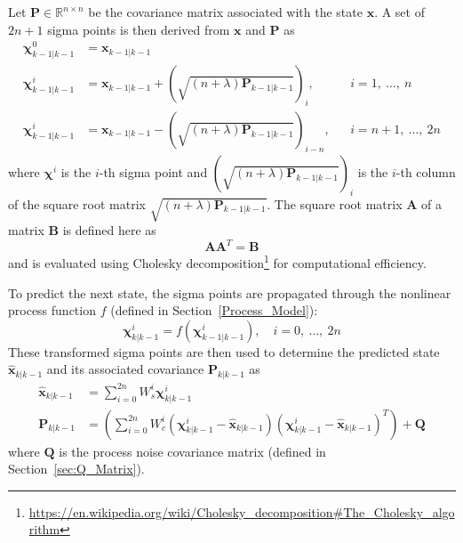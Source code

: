Let $\mathbf{P} \in \mathbb{R}^{n \times n}$ be the covariance matrix associated with the state $\mathbf{x}$. A set of $2n + 1$ sigma points is then derived from $\mathbf{x}$ and $\mathbf{P}$ as
%
\begin{align}
\bm{\chi}^{0}_{k-1 | k-1} &= \mathbf{x}_{k-1 | k-1} \nonumber\\
\bm{\chi}^{i}_{k-1 | k-1} &= \mathbf{x}_{k-1 | k-1} + \left( \sqrt{\left( n + \lambda \right) \mathbf{P}_{k-1 | k-1}} \right)_{i}, &&i = 1,\ \dots,\ n \\
\bm{\chi}^{i}_{k-1 | k-1} &= \mathbf{x}_{k-1 | k-1} - \left( \sqrt{\left( n + \lambda \right) \mathbf{P}_{k-1 | k-1}} \right)_{i-n}, &&i = n+1,\ \dots,\ 2n \nonumber
\end{align}
%
where $\bm{\chi}^{i}$ is the $i$-th sigma point and $\left( \sqrt{\left( n + \lambda \right) \mathbf{P}_{k-1 | k-1}} \right)_{i}$ is the $i$-th column of the square root matrix $\sqrt{\left( n + \lambda \right) \mathbf{P}_{k-1 | k-1}}$. The square root matrix $\mathbf{A}$ of a matrix $\mathbf{B}$ is defined here as
%
\begin{equation}
\mathbf{A} \mathbf{A}^{T} = \mathbf{B}
\end{equation}
%
and is evaluated using Cholesky decomposition\footnote{\url{https://en.wikipedia.org/wiki/Cholesky_decomposition\#The_Cholesky_algorithm}} for computational efficiency.

To predict the next state, the sigma points are propagated through the nonlinear process function $f$ (defined in Section~\ref{Process_Model}):
%
\begin{equation}
\bm{\chi}^{i}_{k | k-1} = f \left( \bm{\chi}^{i}_{k-1 | k-1} \right), \quad i = 0,\ \dots,\ 2n
\end{equation}
%
These transformed sigma points are then used to determine the predicted state $\hat{\mathbf{x}}_{k | k-1}$ and its associated covariance $\mathbf{P}_{k | k-1}$ as
%
\begin{align}
\hat{\mathbf{x}}_{k | k-1} &= \sum^{2n}_{i=0} W^{i}_{s} \bm{\chi}^{i}_{k | k-1} \label{eq:pred_state} \\
\mathbf{P}_{k | k-1} &= \left( \sum^{2n}_{i=0} W^{i}_{c} \left( \bm{\chi}^{i}_{k | k-1} - \hat{\mathbf{x}}_{k | k-1} \right) \left( \bm{\chi}^{i}_{k | k-1} - \hat{\mathbf{x}}_{k | k-1} \right)^{T} \right) + \mathbf{Q}  \label{eq:pred_cov}
\end{align}
%
where $\mathbf{Q}$ is the process noise covariance matrix (defined in Section~\ref{sec:Q_Matrix}).


